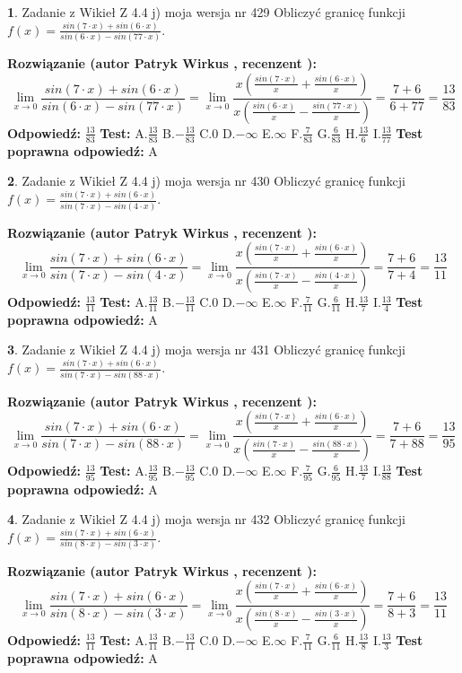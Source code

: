 \documentclass[12pt, a4paper]{article}
\theoremstyle{definition} %
\newtheorem{zad}{}
\newcommand{\zadStart}[1]{\begin{zad}#1\newline}
\newcommand{\zadStop}{\end{zad}}
\newcommand{\rozwStart}[2]{\noindent \textbf{Rozwiązanie (autor #1 , recenzent #2): }\newline}
\newcommand{\rozwStop}{\newline}
\newcommand{\odpStart}{\noindent \textbf{Odpowiedź:}\newline}
\newcommand{\odpStop}{\newline}
\newcommand{\testStart}{\noindent \textbf{Test:}\newline}
\newcommand{\testStop}{\newline}
\newcommand{\kluczStart}{\noindent \textbf{Test poprawna odpowiedź:}\newline}
\newcommand{\kluczStop}{\newline}
\begin{document}
\zadStart{Zadanie z Wikieł Z 4.4 j) moja wersja nr 429}
Obliczyć granicę funkcji $f(x)=\frac{sin(7\cdot x) +sin(6\cdot x)}{sin(6\cdot x) -sin(77\cdot x)}$.
\zadStop
\rozwStart{Patryk Wirkus}{}
$$\lim\limits_{x\to 0}\frac{sin(7\cdot x) +sin(6\cdot x)}{sin(6\cdot x) -sin(77\cdot x)}=\lim\limits_{x\to 0}\frac{x(\frac{sin(7\cdot x)}{x}+\frac{sin(6\cdot x)}{x})}{x(\frac{sin(6\cdot x)}{x}-\frac{sin(77\cdot x)}{x})}=\frac{7+6}{6+77} = \frac{13}{83}$$
\rozwStop
\odpStart
$\frac{13}{83}$
\odpStop
\testStart
A.$\frac{13}{83}$
B.$-\frac{13}{83}$
C.$0$
D.$-\infty$
E.$\infty$
F.$\frac{7}{83}$
G.$\frac{6}{83}$
H.$\frac{13}{6}$
I.$\frac{13}{77}$
\testStop
\kluczStart
A
\kluczStop



\zadStart{Zadanie z Wikieł Z 4.4 j) moja wersja nr 430}
Obliczyć granicę funkcji $f(x)=\frac{sin(7\cdot x) +sin(6\cdot x)}{sin(7\cdot x) -sin(4\cdot x)}$.
\zadStop
\rozwStart{Patryk Wirkus}{}
$$\lim\limits_{x\to 0}\frac{sin(7\cdot x) +sin(6\cdot x)}{sin(7\cdot x) -sin(4\cdot x)}=\lim\limits_{x\to 0}\frac{x(\frac{sin(7\cdot x)}{x}+\frac{sin(6\cdot x)}{x})}{x(\frac{sin(7\cdot x)}{x}-\frac{sin(4\cdot x)}{x})}=\frac{7+6}{7+4} = \frac{13}{11}$$
\rozwStop
\odpStart
$\frac{13}{11}$
\odpStop
\testStart
A.$\frac{13}{11}$
B.$-\frac{13}{11}$
C.$0$
D.$-\infty$
E.$\infty$
F.$\frac{7}{11}$
G.$\frac{6}{11}$
H.$\frac{13}{7}$
I.$\frac{13}{4}$
\testStop
\kluczStart
A
\kluczStop



\zadStart{Zadanie z Wikieł Z 4.4 j) moja wersja nr 431}
Obliczyć granicę funkcji $f(x)=\frac{sin(7\cdot x) +sin(6\cdot x)}{sin(7\cdot x) -sin(88\cdot x)}$.
\zadStop
\rozwStart{Patryk Wirkus}{}
$$\lim\limits_{x\to 0}\frac{sin(7\cdot x) +sin(6\cdot x)}{sin(7\cdot x) -sin(88\cdot x)}=\lim\limits_{x\to 0}\frac{x(\frac{sin(7\cdot x)}{x}+\frac{sin(6\cdot x)}{x})}{x(\frac{sin(7\cdot x)}{x}-\frac{sin(88\cdot x)}{x})}=\frac{7+6}{7+88} = \frac{13}{95}$$
\rozwStop
\odpStart
$\frac{13}{95}$
\odpStop
\testStart
A.$\frac{13}{95}$
B.$-\frac{13}{95}$
C.$0$
D.$-\infty$
E.$\infty$
F.$\frac{7}{95}$
G.$\frac{6}{95}$
H.$\frac{13}{7}$
I.$\frac{13}{88}$
\testStop
\kluczStart
A
\kluczStop



\zadStart{Zadanie z Wikieł Z 4.4 j) moja wersja nr 432}
Obliczyć granicę funkcji $f(x)=\frac{sin(7\cdot x) +sin(6\cdot x)}{sin(8\cdot x) -sin(3\cdot x)}$.
\zadStop
\rozwStart{Patryk Wirkus}{}
$$\lim\limits_{x\to 0}\frac{sin(7\cdot x) +sin(6\cdot x)}{sin(8\cdot x) -sin(3\cdot x)}=\lim\limits_{x\to 0}\frac{x(\frac{sin(7\cdot x)}{x}+\frac{sin(6\cdot x)}{x})}{x(\frac{sin(8\cdot x)}{x}-\frac{sin(3\cdot x)}{x})}=\frac{7+6}{8+3} = \frac{13}{11}$$
\rozwStop
\odpStart
$\frac{13}{11}$
\odpStop
\testStart
A.$\frac{13}{11}$
B.$-\frac{13}{11}$
C.$0$
D.$-\infty$
E.$\infty$
F.$\frac{7}{11}$
G.$\frac{6}{11}$
H.$\frac{13}{8}$
I.$\frac{13}{3}$
\testStop
\kluczStart
A
\kluczStop
\end{document}

